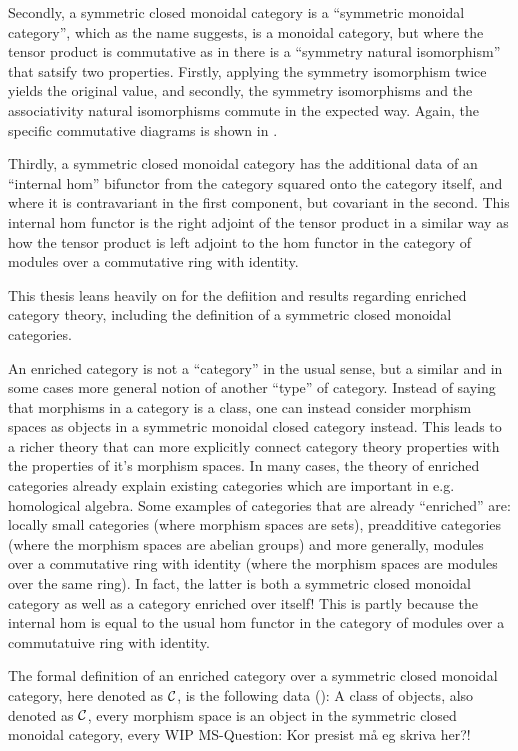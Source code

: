 Secondly, a symmetric closed monoidal category is a ``symmetric monoidal category'', which as the name suggests, is a monoidal category, but where the tensor product is commutative as in there is a ``symmetry natural isomorphism'' that satsify two properties. Firstly, applying the symmetry isomorphism twice yields the original value, and secondly, the symmetry isomorphisms and the associativity natural isomorphisms commute in the expected way. Again, the specific commutative diagrams is shown in \cite[Diagram 6.3, Diagram 6.4, Diagram 6.5]{Borceux_1994}.

Thirdly, a symmetric closed monoidal category has the additional data of an ``internal hom'' bifunctor from the category squared onto the category itself, and where it is contravariant in the first component, but covariant in the second. This internal hom functor is the right adjoint of the tensor product in a similar way as how the tensor product is left adjoint to the hom functor in the category of modules over a commutative ring with identity.

This thesis leans heavily on \cite[Chapter 6]{Borceux_1994} for the defiition and results regarding enriched category theory, including the definition of a symmetric closed monoidal categories.

An enriched category is not a ``category'' in the usual sense, but a similar and in some cases more general notion of another ``type'' of category. Instead of saying that morphisms in a category is a class, one can instead consider morphism spaces as objects in a symmetric monoidal closed category instead. This leads to a richer theory that can more explicitly connect category theory properties with the properties of it's morphism spaces. In many cases, the theory of enriched categories already explain existing categories which are important in e.g. homological algebra. Some examples of categories that are already ``enriched'' are: locally small categories (where morphism spaces are sets), preadditive categories (where the morphism spaces are abelian groups) and more generally, modules over a commutative ring with identity (where the morphism spaces are modules over the same ring). In fact, the latter is both a symmetric closed monoidal category as well as a category enriched over itself! This is partly because the internal hom is equal to the usual hom functor in the category of modules over a commutatuive ring with identity.

The formal definition of an enriched category over a symmetric closed monoidal category, here denoted as \( {\mathcal{C}} \), is the following data (\cite[Definition 6.2.1]{Borceux_1994}): A class of objects, also denoted as \( {\mathcal{C}} \), every morphism space is an object in the symmetric closed monoidal category, every WIP
MS-Question: Kor presist må eg skriva her?!